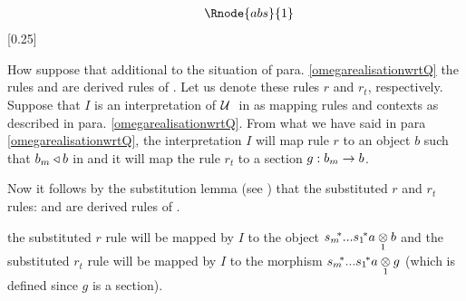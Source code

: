 \begin{oldtt}
\begin{displaymath}
\begin{array}{c p{1cm} c p {1cm} c  p{1cm} c}
																								&&                                           && \Rnode{abs}{1} \ \ \ \ \ \ \ \ &&    
\end{array}
\end{displaymath}
[0.25]

\note 
How suppose that additional to the situation of para. \ref{omegarealisationwrtQ} the rules 
 and   are derived rules of \gatUw. 
Let us denote these rules $r$ and $r_t$, respectively. Suppose that $I$ is an interpretation of $\gatUw$ in \catcw as mapping rules and contexts as described in para. \ref{omegarealisationwrtQ}.
From what we have said in para \ref{omegarealisationwrtQ}, the interpretation  $I$ will map rule $r$ to an object $b$ such that ${b_m \base b}$ in \catcw and it will map the rule $r_t$ to a section $g:b_m \morph b$.  

Now it follows by the substitution lemma (see \cite{Cartmell86})
that the substituted $r$ and $r_t$ rules: 
and   are derived rules of \gatU. 

the substituted $r$ rule will be mapped by $I$ to the object $\smstar...\sonestar\crossx{a}{b}{1}$ and the substituted $r_t$ rule will
be mapped by $I$ to the morphism  $\smstar...\sonestar\crossx{a}{g}{1}$ (which is defined since $g$ is a section).
\end{oldtt}

